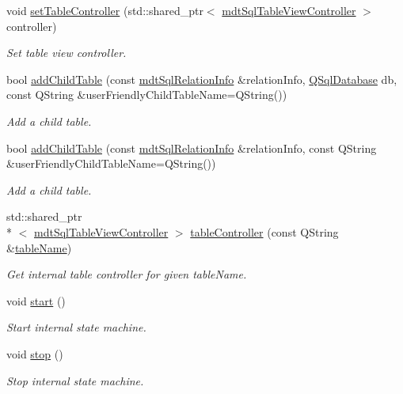 \begin{DoxyCompactItemize}
void \hyperlink{classmdt_sql_table_widget_a4855a76905a856cfe82d3ca3f969f17a}{set\-Table\-Controller} (std\-::shared\-\_\-ptr$<$ \hyperlink{classmdt_sql_table_view_controller}{mdt\-Sql\-Table\-View\-Controller} $>$ controller)
\begin{DoxyCompactList}\small\item\em Set table view controller. \end{DoxyCompactList}\item 
bool \hyperlink{classmdt_sql_table_widget_a2a12dbb0c50177aca0ac57edea6af18d}{add\-Child\-Table} (const \hyperlink{classmdt_sql_relation_info}{mdt\-Sql\-Relation\-Info} \&relation\-Info, \hyperlink{class_q_sql_database}{Q\-Sql\-Database} db, const Q\-String \&user\-Friendly\-Child\-Table\-Name=Q\-String())
\begin{DoxyCompactList}\small\item\em Add a child table. \end{DoxyCompactList}\item 
bool \hyperlink{classmdt_sql_table_widget_ae80d69e391c277b7e4563aea2b1c92d6}{add\-Child\-Table} (const \hyperlink{classmdt_sql_relation_info}{mdt\-Sql\-Relation\-Info} \&relation\-Info, const Q\-String \&user\-Friendly\-Child\-Table\-Name=Q\-String())
\begin{DoxyCompactList}\small\item\em Add a child table. \end{DoxyCompactList}\item 
std\-::shared\-\_\-ptr\\*
$<$ \hyperlink{classmdt_sql_table_view_controller}{mdt\-Sql\-Table\-View\-Controller} $>$ \hyperlink{classmdt_sql_table_widget_a3fdef8f8a617da5d93460f328d5a38fb}{table\-Controller} (const Q\-String \&\hyperlink{classmdt_sql_table_widget_a5ebff43d17810531de12c7c3eb208a85}{table\-Name})
\begin{DoxyCompactList}\small\item\em Get internal table controller for given table\-Name. \end{DoxyCompactList}\item 
void \hyperlink{classmdt_sql_table_widget_abfab2f8ad93b0efdb41dd23007db0bbb}{start} ()
\begin{DoxyCompactList}\small\item\em Start internal state machine. \end{DoxyCompactList}\item 
void \hyperlink{classmdt_sql_table_widget_a071ab9cd7de514a8ba4341234fefce64}{stop} ()
\begin{DoxyCompactList}\small\item\em Stop internal state machine. \end{DoxyCompactList}\item 

\end{DoxyCompactItemize}

